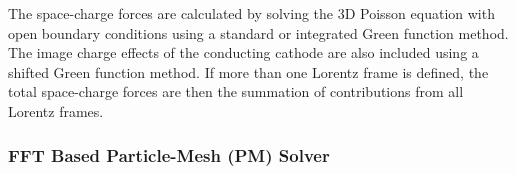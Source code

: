 The space-charge forces are calculated by solving the 3D Poisson equation with open boundary conditions
using a standard or integrated Green function method. The image charge effects of the conducting cathode are also
included using a shifted Green function method. If more than one Lorentz frame is defined, the total space-charge forces are then the summation of contributions from all Lorentz frames. \latermore

\subsubsection{FFT Based Particle-Mesh (PM) Solver}
 \latermore





